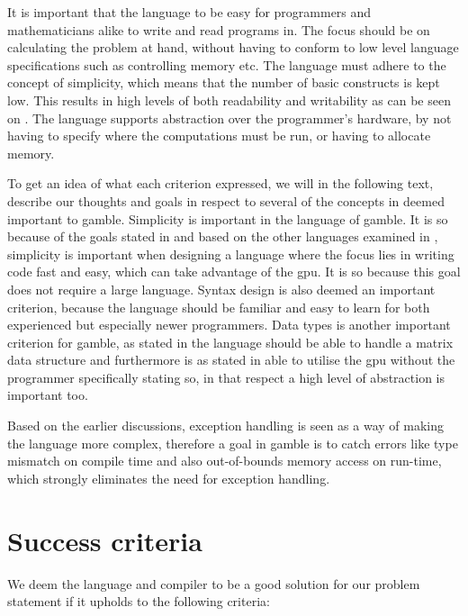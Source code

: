 It is important that the language to be easy for programmers and mathematicians alike to write and read programs in.
The focus should be on calculating the problem at hand, without having to conform to low level language specifications such as controlling memory etc.
The language must adhere to the concept of simplicity, which means that the number of basic constructs is kept low. 
This results in high levels of both readability and writability as can be seen on .
The language supports abstraction over the programmer's hardware, by not having to specify where the computations must be run, or having to allocate memory. 

To get an idea of what each criterion expressed, we will in the following text, describe our thoughts and goals in respect to several of the concepts in  deemed important to \gls{gamble}.
Simplicity is important in the language of \gls{gamble}.
It is so because of the goals stated in  and based on the other languages examined in , simplicity is important when designing a language where the focus lies in writing code fast and easy, which can take advantage of the \acrshort{gpu}.
It is so because this goal does not require a large language. 
Syntax design is also deemed an important criterion, because the language should be familiar and easy to learn for both experienced but especially newer programmers.
Data types is another important criterion for \gls{gamble}, as stated in  the language should be able to handle a matrix data structure and furthermore is as stated in  able to utilise the \acrshort{gpu} without the programmer specifically stating so, in that respect a high level of abstraction is important too. 

Based on the earlier discussions, exception handling is seen as a way of making the language more complex, therefore a goal in \gls{gamble} is to catch errors like type mismatch on compile time and also out-of-bounds memory access on run-time, which strongly eliminates the need for exception handling.


\section{Success criteria}\label{sec:OurCriterias}
We deem the language and compiler to be a good solution for our problem statement if it upholds to the following criteria:


